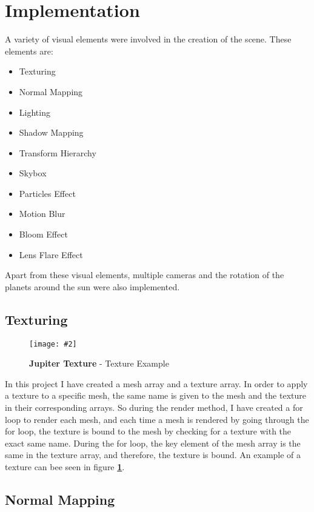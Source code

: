 \documentclass[10pt, a4paper]{article}
\newcommand{\figuremacro}[5]{
    \begin{figure}[#1]
        \centering
        \texttt{[image: \#2]}
        \caption[#3]{\textbf{#3}#4}
        \label{fig:#2}
    \end{figure}
}
\begin{document}


	\fi
	
	

	
	
\section{Implementation}
	A variety of visual elements were involved in the creation of the scene. These elements are:
	\begin{itemize}
		\item Texturing
		\item Normal Mapping
		\item Lighting
		\item Shadow Mapping
		\item Transform Hierarchy
		\item Skybox
		\item Particles Effect
		\item Motion Blur
		\item Bloom Effect
		\item Lens Flare Effect
	\end{itemize}
	Apart from these visual elements, multiple cameras and the rotation of the planets around the sun were also implemented.
\subsection{Texturing}

	\figuremacro{H}{Jupiter}{Jupiter Texture}{ - Texture Example}{1.0}

	In this project I have created a mesh array and a texture array. In order to apply a texture to a specific mesh, the same name is given to the mesh and the texture in their corresponding arrays. So during the render method, I have created a for loop to render each mesh, and each time a mesh is rendered by going through the for loop, the texture is bound to the mesh by checking for a texture with the exact same name. During the for loop, the key element of the mesh array is the same in the texture array, and therefore, the texture is bound. An example of a texture can bee seen in figure \textbf{\ref{fig:Jupiter}}.


\subsection{Normal Mapping}
		
\end{document}
